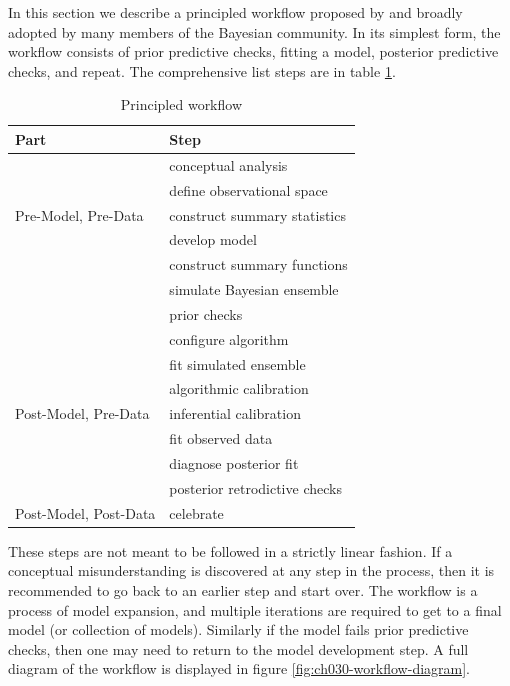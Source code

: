 \documentclass[11pt, oneside, openany]{scrbook}
\begin{document}
In this section we describe a principled workflow proposed by \citet{betancourt2020} and broadly adopted by many members of the Bayesian community. In its simplest form, the workflow consists of prior predictive checks, fitting a model, posterior predictive checks, and repeat. The comprehensive list steps are in table \ref{tab:ch030-workflow-steps}.

\begin{table}[!h]

\caption{\label{tab:ch030-workflow-steps}Principled workflow}
\centering
\begin{tabular}[t]{ll}
\toprule
Part & Step\\
\midrule
 & conceptual analysis\\
\cmidrule{2-2}
 & define observational space\\
\cmidrule{2-2}
\multirow[t]{-3}{*}{\raggedright\arraybackslash Pre-Model, Pre-Data} & construct summary statistics\\
\cmidrule{1-2}
 & develop model\\
\cmidrule{2-2}
 & construct summary functions\\
\cmidrule{2-2}
 & simulate Bayesian ensemble\\
\cmidrule{2-2}
 & prior checks\\
\cmidrule{2-2}
 & configure algorithm\\
\cmidrule{2-2}
 & fit simulated ensemble\\
\cmidrule{2-2}
 & algorithmic calibration\\
\cmidrule{2-2}
\multirow[t]{-8}{*}{\raggedright\arraybackslash Post-Model, Pre-Data} & inferential calibration\\
\cmidrule{1-2}
 & fit observed data\\
\cmidrule{2-2}
 & diagnose posterior fit\\
\cmidrule{2-2}
 & posterior retrodictive checks\\
\cmidrule{2-2}
\multirow[t]{-4}{*}{\raggedright\arraybackslash Post-Model, Post-Data} & celebrate\\
\bottomrule
\end{tabular}
\end{table}

These steps are not meant to be followed in a strictly linear fashion. If a conceptual misunderstanding is discovered at any step in the process, then it is recommended to go back to an earlier step and start over. The workflow is a process of model expansion, and multiple iterations are required to get to a final model (or collection of models). Similarly if the model fails prior predictive checks, then one may need to return to the model development step. A full diagram of the workflow is displayed in figure \ref{fig:ch030-workflow-diagram}.
\end{document}
